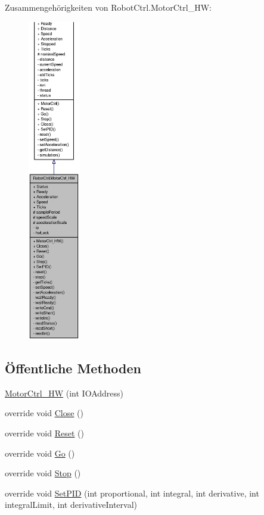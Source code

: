 Zusammengehörigkeiten von RobotCtrl.MotorCtrl\_\-HW:\nopagebreak
\begin{figure}[H]
\begin{center}
\leavevmode
\includegraphics[height=400pt]{class_robot_ctrl_1_1_motor_ctrl___h_w__coll__graph}
\end{center}
\end{figure}
\subsection*{Öffentliche Methoden}
\begin{DoxyCompactItemize}
\item 
\hyperlink{class_robot_ctrl_1_1_motor_ctrl___h_w_af9fb7c75d12f00d852304d58bd31bcea}{MotorCtrl\_\-HW} (int IOAddress)
\item 
override void \hyperlink{class_robot_ctrl_1_1_motor_ctrl___h_w_a134912d08a58d3762ce7694294599d7c}{Close} ()
\item 
override void \hyperlink{class_robot_ctrl_1_1_motor_ctrl___h_w_a1a116e83d87c50119567ff4ae334b239}{Reset} ()
\item 
override void \hyperlink{class_robot_ctrl_1_1_motor_ctrl___h_w_a451b6be6938c652e8a284545a1929089}{Go} ()
\item 
override void \hyperlink{class_robot_ctrl_1_1_motor_ctrl___h_w_ad7a992614ff75966b4381f8f8ef56cfd}{Stop} ()
\item 
override void \hyperlink{class_robot_ctrl_1_1_motor_ctrl___h_w_a24f22cd266cce1e701f9823e02816ff5}{SetPID} (int proportional, int integral, int derivative, int integralLimit, int derivativeInterval)
\end{DoxyCompactItemize}

